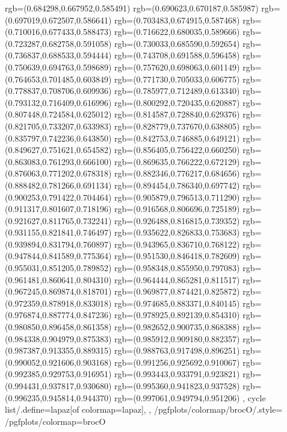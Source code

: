 {{{			rgb=(0.684298,0.667952,0.585491)
			rgb=(0.690623,0.670187,0.585987)
			rgb=(0.697019,0.672507,0.586641)
			rgb=(0.703483,0.674915,0.587468)
			rgb=(0.710016,0.677433,0.588473)
			rgb=(0.716622,0.680035,0.589666)
			rgb=(0.723287,0.682758,0.591058)
			rgb=(0.730033,0.685590,0.592654)
			rgb=(0.736837,0.688533,0.594444)
			rgb=(0.743708,0.691588,0.596458)
			rgb=(0.750639,0.694763,0.598689)
			rgb=(0.757620,0.698063,0.601149)
			rgb=(0.764653,0.701485,0.603849)
			rgb=(0.771730,0.705033,0.606775)
			rgb=(0.778837,0.708706,0.609936)
			rgb=(0.785977,0.712489,0.613340)
			rgb=(0.793132,0.716409,0.616996)
			rgb=(0.800292,0.720435,0.620887)
			rgb=(0.807448,0.724584,0.625012)
			rgb=(0.814587,0.728840,0.629376)
			rgb=(0.821705,0.733207,0.633983)
			rgb=(0.828779,0.737670,0.638805)
			rgb=(0.835797,0.742236,0.643850)
			rgb=(0.842753,0.746885,0.649121)
			rgb=(0.849627,0.751621,0.654582)
			rgb=(0.856405,0.756422,0.660250)
			rgb=(0.863083,0.761293,0.666100)
			rgb=(0.869635,0.766222,0.672129)
			rgb=(0.876063,0.771202,0.678318)
			rgb=(0.882346,0.776217,0.684656)
			rgb=(0.888482,0.781266,0.691134)
			rgb=(0.894454,0.786340,0.697742)
			rgb=(0.900253,0.791422,0.704464)
			rgb=(0.905879,0.796513,0.711290)
			rgb=(0.911317,0.801607,0.718196)
			rgb=(0.916568,0.806696,0.725189)
			rgb=(0.921627,0.811765,0.732241)
			rgb=(0.926488,0.816815,0.739352)
			rgb=(0.931155,0.821841,0.746497)
			rgb=(0.935622,0.826833,0.753683)
			rgb=(0.939894,0.831794,0.760897)
			rgb=(0.943965,0.836710,0.768122)
			rgb=(0.947844,0.841589,0.775364)
			rgb=(0.951530,0.846418,0.782609)
			rgb=(0.955031,0.851205,0.789852)
			rgb=(0.958348,0.855950,0.797083)
			rgb=(0.961481,0.860641,0.804310)
			rgb=(0.964444,0.865281,0.811517)
			rgb=(0.967245,0.869874,0.818701)
			rgb=(0.969877,0.874421,0.825872)
			rgb=(0.972359,0.878918,0.833018)
			rgb=(0.974685,0.883371,0.840145)
			rgb=(0.976874,0.887774,0.847236)
			rgb=(0.978925,0.892139,0.854310)
			rgb=(0.980850,0.896458,0.861358)
			rgb=(0.982652,0.900735,0.868388)
			rgb=(0.984338,0.904979,0.875383)
			rgb=(0.985912,0.909180,0.882357)
			rgb=(0.987387,0.913355,0.889315)
			rgb=(0.988763,0.917498,0.896251)
			rgb=(0.990052,0.921606,0.903168)
			rgb=(0.991256,0.925692,0.910067)
			rgb=(0.992385,0.929753,0.916951)
			rgb=(0.993443,0.933791,0.923821)
			rgb=(0.994431,0.937817,0.930680)
			rgb=(0.995360,0.941823,0.937528)
			rgb=(0.996235,0.945814,0.944370)
			rgb=(0.997061,0.949794,0.951206)
		},
	cycle list/.define={lapaz}{[of colormap=lapaz]},
	},
	/pgfplots/colormap/brocO/.style={
		/pgfplots/colormap={brocO}{%
}}}
